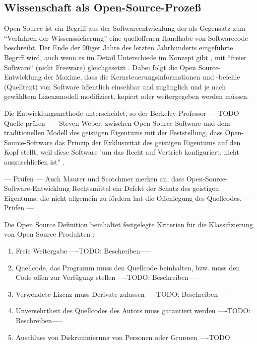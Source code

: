 \subsection{Wissenschaft als Open-Source-Prozeß}

Open Source ist ein Begriff aus der Softwareentwicklung der als Gegensatz zum “Verfahren der Wissenssicherung” \cite{stallman2002} eine quelloffenen Handhabe von Softwarecode beschreibt. Der Ende der 90iger Jahre des letzten Jahrhunderts eingeführte Begriff wird, auch wenn es im Detail Unterschiede im Konzept gibt \cite{suchen}, mit “freier Software“ (nicht Freeware) gleichgesetzt \cite{suchen}. Dabei folgt die Open Source-Entwicklung der Maxime, dass die Kernsteuerungsinformationen und -befehle (Quelltext) von Software öffentlich einsehbar und zugänglich und je nach gewähltem Lizenzmodell modifiziert, kopiert oder weitergegeben werden müssen\cite{suchen}. 

Die Entwicklungsmethode unterscheidet, so der Berkeley-Professor --- TODO Quelle prüfen ---- Steven Weber, zwischen Open-Source-Software und dem traditionellen Modell des geistigen Eigentums mit der Feststellung, dass Open-Source-Software das Prinzip der Exklusivität des geistigen Eigentums auf den Kopf stellt, weil diese Software 'um das Recht auf Vertrieb konfiguriert, nicht auszuschließen ist" \cite{suchen}. 

--- Prüfen ---
Auch Maurer und Scotchmer merken an, dass Open-Source-Software-Entwicklung Rechtsmittel ein Defekt der Schutz des geistigen Eigentums, die nicht allgemein zu fördern hat die Offenlegung des Quellcodes. 
--- Prüfen ---

Die Open Source Definition beinhaltet festgelegte Kriterien für die Klassifizierung von Open Source Produkten \cite{suchen}:
\begin{enumerate}
\item Freie Weitergabe
----TODO: Beschreiben-----
\item Quellcode, das Programm muss den Quellcode beinhalten, bzw. muss den Code offen zur Verfügung stellen
----TODO: Beschreiben-----
\item Verwendete Lizenz muss Derivate zulassen
----TODO: Beschreiben-----
\item Unversehrtheit des Quellcodes des Autors muss garantiert werden
----TODO: Beschreiben-----
\item Auschluss von Diskriminierung von Personen oder Gruppen
----TODO: Beschreiben-----
\item Keine Enschränkung des Einsatzfeldes
----TODO: Beschreiben-----
\item Lizenz muss weitergegeben werden könnne
----TODO: Beschreiben-----
\item Lizenz muss auf das Produktpaket angewandt werden
----TODO: Beschreiben-----
\item Lizenz darf die Weitergabe zusammen mit anderer Software nicht einschränken
----TODO: Beschreiben-----
\end{enumerate}

